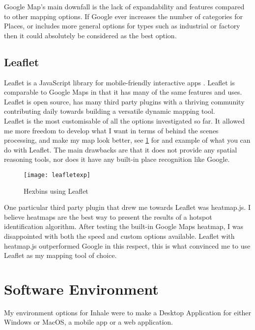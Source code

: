 Google Map's main downfall is the lack of expandability and features compared to other mapping options. If Google ever increases the number of categories for Places, or includes more general options for types such as industrial or factory then it could absolutely be considered as the best option.\\

\subsection{Leaflet}

Leaflet is a JavaScript library for mobile-friendly interactive apps \cite{leaflet}. Leaflet is comparable to Google Maps in that it has many of the same features and uses. Leaflet is open source, has many third party plugins with a thriving community contributing daily towards building a versatile dynamic mapping tool.\\

Leaflet is the most customisable of all the options investigated so far. It allowed me more freedom to develop what I want in terms of behind the scenes processing, and make my map look better, see \ref{fig:leafletexf} for and example of what you can do with Leaflet. The main drawbacks are that it does not provide any spatial reasoning tools, nor does it have any built-in place recognition like Google.\\

\begin{figure}[H]
\begin{center}
\texttt{[image: leafletexp]}
\label{fig:leafletexf}
\caption{Hexbins using Leaflet}
\end{center}
\end{figure}

One particular third party plugin that drew me towards Leaflet was heatmap.js. I believe heatmaps are the best way to present the results of a hotspot identification algorithm. After testing the built-in Google Maps heatmap, I was disappointed with both the speed and custom options available. Leaflet with heatmap.js outperformed Google in this respect, this is what convinced me to use Leaflet as my mapping tool of choice.

\section{Software Environment}

My environment options for Inhale were to make a Desktop Application for either Windows or MacOS, a mobile app or a web application.\\

